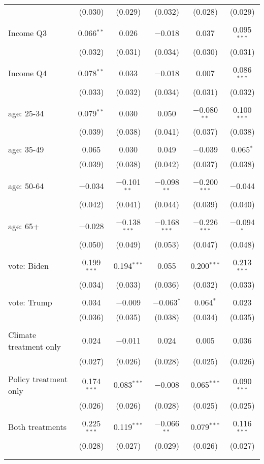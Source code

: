 \begin{tabular}{@{\extracolsep{5pt}}lccccc}
  & (0.030) & (0.029) & (0.032) & (0.028) & (0.029) \\ 
  & & & & & \\ 
 Income Q3 & 0.066$^{**}$ & 0.026 & $-$0.018 & 0.037 & 0.095$^{***}$ \\ 
  & (0.032) & (0.031) & (0.034) & (0.030) & (0.031) \\ 
  & & & & & \\ 
 Income Q4 & 0.078$^{**}$ & 0.033 & $-$0.018 & 0.007 & 0.086$^{***}$ \\ 
  & (0.033) & (0.032) & (0.034) & (0.031) & (0.032) \\ 
  & & & & & \\ 
 age: 25-34 & 0.079$^{**}$ & 0.030 & 0.050 & $-$0.080$^{**}$ & 0.100$^{***}$ \\ 
  & (0.039) & (0.038) & (0.041) & (0.037) & (0.038) \\ 
  & & & & & \\ 
 age: 35-49 & 0.065 & 0.030 & 0.049 & $-$0.039 & 0.065$^{*}$ \\ 
  & (0.039) & (0.038) & (0.042) & (0.037) & (0.038) \\ 
  & & & & & \\ 
 age: 50-64 & $-$0.034 & $-$0.101$^{**}$ & $-$0.098$^{**}$ & $-$0.200$^{***}$ & $-$0.044 \\ 
  & (0.042) & (0.041) & (0.044) & (0.039) & (0.040) \\ 
  & & & & & \\ 
 age: 65+ & $-$0.028 & $-$0.138$^{***}$ & $-$0.168$^{***}$ & $-$0.226$^{***}$ & $-$0.094$^{*}$ \\ 
  & (0.050) & (0.049) & (0.053) & (0.047) & (0.048) \\ 
  & & & & & \\ 
 vote: Biden & 0.199$^{***}$ & 0.194$^{***}$ & 0.055 & 0.200$^{***}$ & 0.213$^{***}$ \\ 
  & (0.034) & (0.033) & (0.036) & (0.032) & (0.033) \\ 
  & & & & & \\ 
 vote: Trump & 0.034 & $-$0.009 & $-$0.063$^{*}$ & 0.064$^{*}$ & 0.023 \\ 
  & (0.036) & (0.035) & (0.038) & (0.034) & (0.035) \\ 
  & & & & & \\ 
 Climate treatment only & 0.024 & $-$0.011 & 0.024 & 0.005 & 0.036 \\ 
  & (0.027) & (0.026) & (0.028) & (0.025) & (0.026) \\ 
  & & & & & \\ 
 Policy treatment only & 0.174$^{***}$ & 0.083$^{***}$ & $-$0.008 & 0.065$^{***}$ & 0.090$^{***}$ \\ 
  & (0.026) & (0.026) & (0.028) & (0.025) & (0.025) \\ 
  & & & & & \\ 
 Both treatments & 0.225$^{***}$ & 0.119$^{***}$ & $-$0.066$^{**}$ & 0.079$^{***}$ & 0.116$^{***}$ \\ 
  & (0.028) & (0.027) & (0.029) & (0.026) & (0.027) \\ 
  & & & & & \\ 
\hline \\[-1.8ex] 


\end{tabular}
